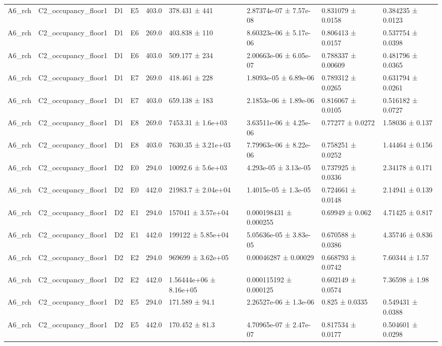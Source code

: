 \begin{table}
\begin{tabular}{lllllllll}
A6\_rch & C2\_occupancy\_floor1 & D1 & E5 & 403.0 & 378.431 ± 441 & 2.87374e-07 ± 7.57e-08 & 0.831079 ± 0.0158 & 0.384235 ± 0.0123 \\
A6\_rch & C2\_occupancy\_floor1 & D1 & E6 & 269.0 & 403.838 ± 110 & 8.60323e-06 ± 5.17e-06 & 0.806413 ± 0.0157 & 0.537754 ± 0.0398 \\
A6\_rch & C2\_occupancy\_floor1 & D1 & E6 & 403.0 & 509.177 ± 234 & 2.00663e-06 ± 6.05e-07 & 0.788337 ± 0.00609 & 0.481796 ± 0.0365 \\
A6\_rch & C2\_occupancy\_floor1 & D1 & E7 & 269.0 & 418.461 ± 228 & 1.8093e-05 ± 6.89e-06 & 0.789312 ± 0.0265 & 0.631794 ± 0.0261 \\
A6\_rch & C2\_occupancy\_floor1 & D1 & E7 & 403.0 & 659.138 ± 183 & 2.1853e-06 ± 1.89e-06 & 0.816067 ± 0.0105 & 0.516182 ± 0.0727 \\
A6\_rch & C2\_occupancy\_floor1 & D1 & E8 & 269.0 & 7453.31 ± 1.6e+03 & 3.63511e-06 ± 4.25e-06 & 0.77277 ± 0.0272 & 1.58036 ± 0.137 \\
A6\_rch & C2\_occupancy\_floor1 & D1 & E8 & 403.0 & 7630.35 ± 3.21e+03 & 7.79963e-06 ± 8.22e-06 & 0.758251 ± 0.0252 & 1.44464 ± 0.156 \\
A6\_rch & C2\_occupancy\_floor1 & D2 & E0 & 294.0 & 10092.6 ± 5.6e+03 & 4.293e-05 ± 3.13e-05 & 0.737925 ± 0.0336 & 2.34178 ± 0.171 \\
A6\_rch & C2\_occupancy\_floor1 & D2 & E0 & 442.0 & 21983.7 ± 2.04e+04 & 1.4015e-05 ± 1.3e-05 & 0.724661 ± 0.0148 & 2.14941 ± 0.139 \\
A6\_rch & C2\_occupancy\_floor1 & D2 & E1 & 294.0 & 157041 ± 3.57e+04 & 0.000198431 ± 0.000255 & 0.69949 ± 0.062 & 4.71425 ± 0.817 \\
A6\_rch & C2\_occupancy\_floor1 & D2 & E1 & 442.0 & 199122 ± 5.85e+04 & 5.05636e-05 ± 3.83e-05 & 0.670588 ± 0.0386 & 4.35746 ± 0.836 \\
A6\_rch & C2\_occupancy\_floor1 & D2 & E2 & 294.0 & 969699 ± 3.62e+05 & 0.00046287 ± 0.00029 & 0.668793 ± 0.0742 & 7.60344 ± 1.57 \\
A6\_rch & C2\_occupancy\_floor1 & D2 & E2 & 442.0 & 1.56444e+06 ± 8.16e+05 & 0.000115192 ± 0.000125 & 0.602149 ± 0.0574 & 7.36598 ± 1.98 \\
A6\_rch & C2\_occupancy\_floor1 & D2 & E5 & 294.0 & 171.589 ± 94.1 & 2.26527e-06 ± 1.3e-06 & 0.825 ± 0.0335 & 0.549431 ± 0.0388 \\
A6\_rch & C2\_occupancy\_floor1 & D2 & E5 & 442.0 & 170.452 ± 81.3 & 4.70965e-07 ± 2.47e-07 & 0.817534 ± 0.0177 & 0.504601 ± 0.0298 \\

\end{tabular}
\end{table}
